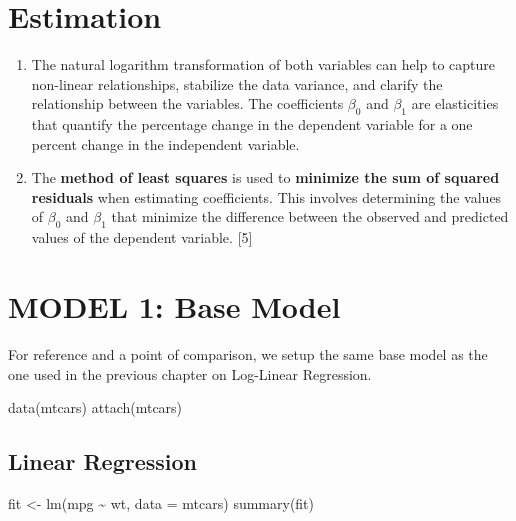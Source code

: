 \documentclass[
  letterpaper,
  DIV=11,
  numbers=noendperiod]{scrreport}
\newenvironment{Shaded}{\begin{snugshade}}{\end{snugshade}}
\newcommand{\AttributeTok}[1]{\textcolor[rgb]{0.40,0.45,0.13}{#1}}
\newcommand{\FunctionTok}[1]{\textcolor[rgb]{0.28,0.35,0.67}{#1}}
\newcommand{\NormalTok}[1]{\textcolor[rgb]{0.00,0.23,0.31}{#1}}
\newcommand{\OtherTok}[1]{\textcolor[rgb]{0.00,0.23,0.31}{#1}}
\newcommand{\SpecialCharTok}[1]{\textcolor[rgb]{0.37,0.37,0.37}{#1}}
\begin{document}
\section{Estimation}\label{estimation}

\begin{enumerate}
\def\labelenumi{\arabic{enumi}.}
\item
  The natural logarithm transformation of both variables can help to
  capture non-linear relationships, stabilize the data variance, and
  clarify the relationship between the variables. The coefficients
  \(β_0\) and \(β_1\) are elasticities that quantify the percentage
  change in the dependent variable for a one percent change in the
  independent variable.
\item
  The \textbf{method of least squares} is used to \textbf{minimize the
  sum of squared residuals} when estimating coefficients. This involves
  determining the values of \(β_0\) and \(β_1\) that minimize the
  difference between the observed and predicted values of the dependent
  variable. {[}5{]}
\end{enumerate}

\section{MODEL 1: Base Model}\label{model-1-base-model}

For reference and a point of comparison, we setup the same base model as
the one used in the previous chapter on Log-Linear Regression.

\begin{Shaded}
\begin{Highlighting}[]
\FunctionTok{data}\NormalTok{(mtcars)}
\FunctionTok{attach}\NormalTok{(mtcars)}
\end{Highlighting}
\end{Shaded}

\subsection{Linear Regression}\label{linear-regression}

\begin{Shaded}
\begin{Highlighting}[]
\NormalTok{fit }\OtherTok{\textless{}{-}} \FunctionTok{lm}\NormalTok{(mpg }\SpecialCharTok{\textasciitilde{}}\NormalTok{ wt, }\AttributeTok{data =}\NormalTok{ mtcars)}
\FunctionTok{summary}\NormalTok{(fit)}
\end{Highlighting}
\end{Shaded}
\end{document}
